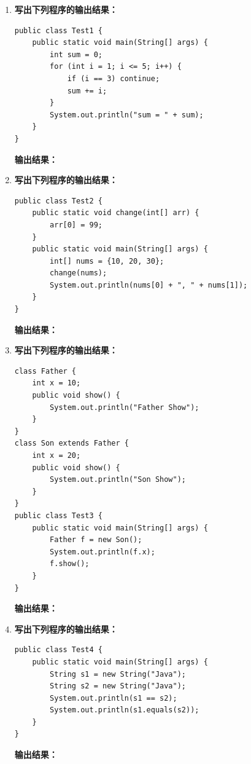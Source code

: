 \documentclass[a3paper, landscape, 11pt, twocolumn]{article}
\begin{document}
\begin{enumerate}[label=\arabic*., itemsep=1em]
	\item \textbf{写出下列程序的输出结果：}
	      \begin{lstlisting}[style=JavaExam]
public class Test1 {
    public static void main(String[] args) {
        int sum = 0;
        for (int i = 1; i <= 5; i++) {
            if (i == 3) continue;
            sum += i;
        }
        System.out.println("sum = " + sum);
    }
}
\end{lstlisting}
	      \textbf{输出结果：}\underline{\hspace{8cm}}

	\item \textbf{写出下列程序的输出结果：}
	      \begin{lstlisting}[style=JavaExam]
public class Test2 {
    public static void change(int[] arr) {
        arr[0] = 99;
    }
    public static void main(String[] args) {
        int[] nums = {10, 20, 30};
        change(nums);
        System.out.println(nums[0] + ", " + nums[1]);
    }
}
\end{lstlisting}
	      \textbf{输出结果：}\underline{\hspace{8cm}}

	\item \textbf{写出下列程序的输出结果：}
	      \begin{lstlisting}[style=JavaExam]
class Father {
    int x = 10;
    public void show() {
        System.out.println("Father Show");
    }
}
class Son extends Father {
    int x = 20;
    public void show() {
        System.out.println("Son Show");
    }
}
public class Test3 {
    public static void main(String[] args) {
        Father f = new Son();
        System.out.println(f.x);
        f.show();
    }
}
\end{lstlisting}
	      \textbf{输出结果：}\underline{\hspace{8cm}}

	\item \textbf{写出下列程序的输出结果：}
	      \begin{lstlisting}[style=JavaExam]
public class Test4 {
    public static void main(String[] args) {
        String s1 = new String("Java");
        String s2 = new String("Java");
        System.out.println(s1 == s2);
        System.out.println(s1.equals(s2));
    }
}
\end{lstlisting}
	      \textbf{输出结果：}\underline{\hspace{8cm}}


\end{enumerate}
\end{document}

